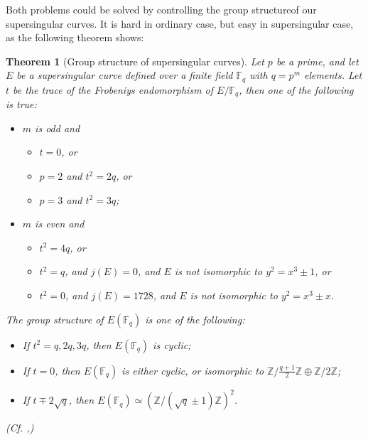\documentclass{article}
\theoremstyle{theorem}
\newtheorem{theorem}{Theorem}
\theoremstyle{definition}
\begin{document}
Both problems could be solved by controlling the group structureof our supersingular curves. It is hard in ordinary case, but easy in supersingular case, as the following theorem shows:

\begin{theorem}[Group structure of supersingular curves]
	Let $p$ be a prime, and let $E$ be a supersingular curve defined over a finite field $\mathbb{F}_q$ with $q = p^m$ elements. Let $t$ be the trace of the Frobeniys endomorphism of $E/\mathbb{F}_q$, then one of the following is true:
	
		\begin{itemize}
			\item $m$ is odd and
					
					\begin{itemize}
						\item $t = 0$, or
						
						\item $p = 2$ and $t^2 = 2q$, or
						
						\item $p = 3$ and $t^2 = 3q$;
					\end{itemize}
			
			\item $m$ is even and
					
					\begin{itemize}
						\item $t^2 = 4q$, or
						
						\item  $t^2 = q$, and $j(E) = 0$, and $E$ is not isomorphic to $y^2 = x^3 \pm 1$, or
						
						\item $t^2 = 0$, and $j(E) = 1728$, and $E$ is not isomorphic to $y^2 = x^3 \pm x$.
					\end{itemize}
		\end{itemize}
	The group structure of $E(\mathbb{F}_q)$ is one of the following:
	
	\begin{itemize}
		\item If $t^2 = q, 2q, 3q$, then $E(\mathbb{F}_q)$ is cyclic;
		
		\item If $t = 0$, then $E(\mathbb{F}_q)$ is either cyclic, or isomorphic to $\mathbb{Z}/ \frac{q + 1}{2}\mathbb{Z} \oplus \mathbb{Z}/2\mathbb{Z}$;
		
		\item  If $t \mp 2\sqrt{q}$, then $E(\mathbb{F}_q) \simeq (\mathbb{Z}/(\sqrt{q} \pm 1)\mathbb{Z})^2$.
	\end{itemize}
(Cf. \cite{Waterhouse},\cite{MOV})
\end{theorem}
\end{document}
